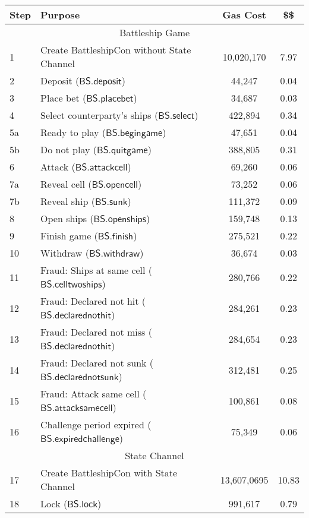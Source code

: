 \documentclass{llncs}
\newcommand{\battleshipattackcell}{\mathsf{BS.attackcell}}
\newcommand{\battleshipbegin}{\mathsf{BS.begingame}}
\newcommand{\battleshipquit}{\mathsf{BS.quitgame}}
\newcommand{\battleshipplacebet}{\mathsf{BS.placebet}}
\newcommand{\battleshipselectboard}{\mathsf{BS.select}}
\newcommand{\battleshiprevealcell}{\mathsf{BS.opencell}}
\newcommand{\battleshipsinking}{\mathsf{BS.sunk}}
\newcommand{\battleshiprevealboard}{\mathsf{BS.openships}}
\newcommand{\battleshipdeposit}{\mathsf{BS.deposit}}
\newcommand{\battleshipwithdraw}{\mathsf{BS.withdraw}}
\newcommand{\battleshipfinish}{\mathsf{BS.finish}}
\newcommand{\battleshipdeclarednotsunk}{\mathsf{BS.declarednotsunk}}
\newcommand{\battleshipdeclarednothit}{\mathsf{BS.declarednothit}}
\newcommand{\battleshipsamecell}{\mathsf{BS.attacksamecell}}
\newcommand{\battleshiptwoships}{\mathsf{BS.celltwoships}}
\newcommand{\battleshipchallengeexpired}{\mathsf{BS.expiredchallenge}}
\newcommand{\battleshiplock}{\mathsf{BS.lock}}
\begin{document}
		\begin{table}
		\centering
		\begin{tabular}[]{l l c c}
			
			\textbf{Step} & \textbf{Purpose} & \textbf{Gas Cost} & \textbf{\$\$}  \\ 
			\hline
			\multicolumn{4}{c}{Battleship Game} \\
			\hline
			1 & Create BattleshipCon without State Channel & 10,020,170 & 7.97 \\
			2 & Deposit ($\battleshipdeposit$) & 44,247 & 0.04 \\
			3 & Place bet ($\battleshipplacebet$)& 34,687 & 0.03 \\
			4 & Select counterparty's ships ($\battleshipselectboard$) & 422,894 & 0.34 \\ 
			5a & Ready to play ($\battleshipbegin$) & 47,651 & 0.04 \\
			5b & Do not play ($\battleshipquit$) & 388,805 & 0.31 \\
			6 & Attack ($\battleshipattackcell$) & 69,260 & 0.06 \\
			7a & Reveal cell ($\battleshiprevealcell$) & 73,252 & 0.06 \\
			7b & Reveal ship ($\battleshipsinking$)& 111,372 & 0.09  \\
			8 & Open ships ($\battleshiprevealboard$) & 159,748 & 0.13 \\
			9 & Finish game ($\battleshipfinish$) & 275,521 & 0.22 \\
			10 & Withdraw ($\battleshipwithdraw$) & 36,674 & 0.03 \\ 
			11 & Fraud: Ships at same cell ($\battleshiptwoships$) & 280,766 & 0.22\\
			12 & Fraud: Declared not hit ($\battleshipdeclarednothit$) & 284,261 & 0.23 \\
			13 & Fraud: Declared not miss ($\battleshipdeclarednothit$) & 284,654 & 0.23 \\
			14 & Fraud: Declared not sunk ($\battleshipdeclarednotsunk$) & 312,481 & 0.25 \\
			15 & Fraud: Attack same cell ($\battleshipsamecell$) & 100,861 & 0.08 \\
			16 & Challenge period expired ($\battleshipchallengeexpired$) &75,349 & 0.06 \\
			\hline
			\multicolumn{4}{c}{State Channel} \\
			\hline
			17 & Create BattleshipCon with State Channel & 13,607,0695 & 10.83 \\
			18 & Lock ($\battleshiplock$) & 991,617 & 0.79 \\

\end{tabular}
\end{table}
\end{document}
